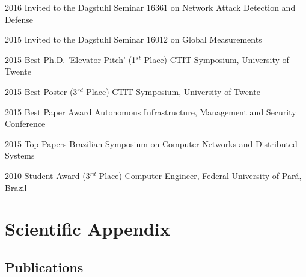 \documentclass[print]{styles/friggeri-cv-linux} %
\begin{document}
\begin{entrylist}

\vspace{-0.3cm}
\entry
{2016}
{Invited to the Dagstuhl Seminar 16361}
{on Network Attack Detection and Defense}

\vspace{-0.3cm}
\entry
{2015}
{Invited to the Dagstuhl Seminar 16012}
{on Global Measurements}

\vspace{-0.3cm}
\entry
{2015}
{Best Ph.D. 'Elevator Pitch' (1$^{st}$ Place)}
{CTIT Symposium, University of Twente}

\vspace{-0.3cm}
\entry
{2015}
{Best Poster (3$^{rd}$ Place)}
{CTIT Symposium, University of Twente}

\vspace{-0.3cm}
\entry
{2015}
{Best Paper Award}
{Autonomous Infrastructure, Management and Security Conference}

\vspace{-0.3cm}
\entry
{2015}
{Top Papers}
{Brazilian Symposium on Computer Networks and Distributed Systems}

\vspace{-0.3cm}
\entry
{2010}
{Student Award (3$^{rd}$ Place)}
{Computer Engineer, Federal University of Pará, Brazil}

\end{entrylist}


\newpage
\section{Scientific Appendix}\vspace{-5pt}

\subsection{Publications}
\vspace{-1cm}
\nocite{*}
\printbibliography[title={\emptyset}]
\end{document}
